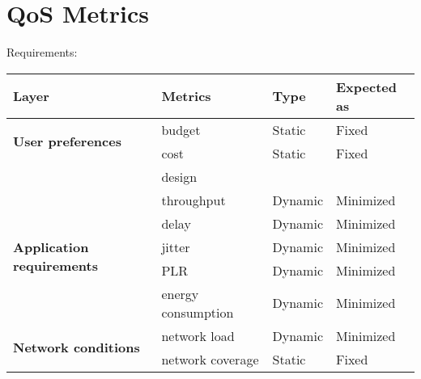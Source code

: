 \section{QoS Metrics}
\label{cha:metrics}


Requirements:

\begin{table}[h!]
	\begin{tabular}{l|l|l|l}
	\textbf{Layer}                                & \textbf{Metrics}     & \textbf{Type} & \textbf{Expected as}  \\\hline
	\multirow{2}{*}{\textbf{User preferences}}         & budget                  & Static        & Fixed      \\
	\                                                  & cost                    & Static        & Fixed      \\
	\                                                  & design                  &               &            \\\hline
	\multirow{5}{*}{\textbf{Application requirements}} & throughput              & Dynamic       & Minimized  \\
	\                                                  & delay                   & Dynamic       & Minimized  \\
	\                                                  & jitter                  & Dynamic       & Minimized  \\
	\                                                  & PLR                     & Dynamic       & Minimized  \\
	\                                                  & energy consumption      & Dynamic       & Minimized  \\\hline
	\multirow{4}{*}{\textbf{Network conditions}}       & network load            & Dynamic       & Minimized  \\
	\                                                  & network coverage        & Static        & Fixed      \\

\end{tabular}
\end{table}
